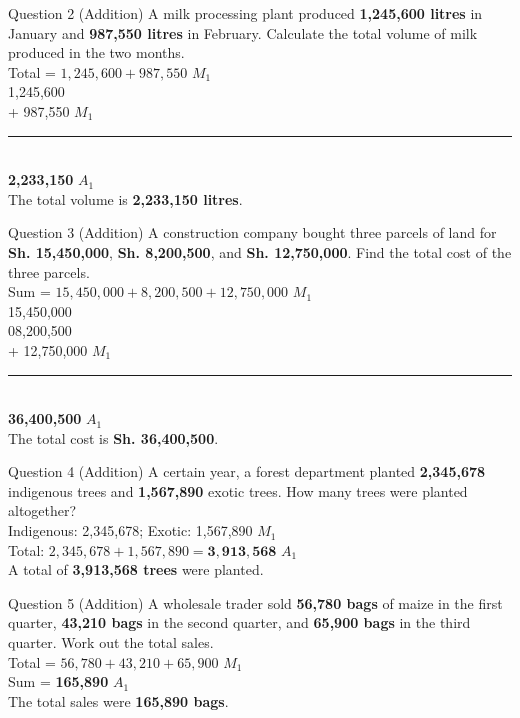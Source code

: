 \documentclass[12pt, a4paper, oneside]{article}
\begin{document}
\begin{solvingbox}{Question 2 (Addition)}
A milk processing plant produced \textbf{1,245,600 litres} in January and \textbf{987,550 litres} in February. Calculate the total volume of milk produced in the two months. \\
Total = $1,245,600 + 987,550$ \hfill $M_1$ \\
\phantom{+} 1,245,600 \\
+ \phantom{1,}987,550 \hfill $M_1$ \\
\rule{2.5cm}{0.4pt} \\
\textbf{2,233,150} \hfill $A_1$ \\
The total volume is \textbf{2,233,150 litres}.
\end{solvingbox}

\begin{solvingbox}{Question 3 (Addition)}
A construction company bought three parcels of land for \textbf{Sh. 15,450,000}, \textbf{Sh. 8,200,500}, and \textbf{Sh. 12,750,000}. Find the total cost of the three parcels. \\
Sum = $15,450,000 + 8,200,500 + 12,750,000$ \hfill $M_1$ \\
\phantom{+} 15,450,000 \\
\phantom{+} 08,200,500 \\
+ 12,750,000 \hfill $M_1$ \\
\rule{2.5cm}{0.4pt} \\
\textbf{36,400,500} \hfill $A_1$ \\
The total cost is \textbf{Sh. 36,400,500}.
\end{solvingbox}

\begin{solvingbox}{Question 4 (Addition)}
A certain year, a forest department planted \textbf{2,345,678} indigenous trees and \textbf{1,567,890} exotic trees. How many trees were planted altogether? \\
Indigenous: 2,345,678; Exotic: 1,567,890 \hfill $M_1$ \\
Total: $2,345,678 + 1,567,890 = \mathbf{3,913,568}$ \hfill $A_1$ \\
A total of \textbf{3,913,568 trees} were planted.
\end{solvingbox}

\begin{solvingbox}{Question 5 (Addition)}
A wholesale trader sold \textbf{56,780 bags} of maize in the first quarter, \textbf{43,210 bags} in the second quarter, and \textbf{65,900 bags} in the third quarter. Work out the total sales. \\
Total = $56,780 + 43,210 + 65,900$ \hfill $M_1$ \\
Sum = \textbf{165,890} \hfill $A_1$ \\
The total sales were \textbf{165,890 bags}.
\end{solvingbox}
\end{document}
